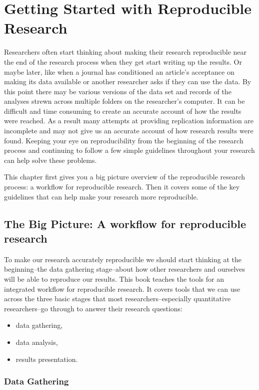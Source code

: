 \documentclass[ChapterTOCs,krantz1]{krantz}\usepackage{graphicx, color}
\begin{document}
\chapter{Getting Started with Reproducible Research}\label{GettingStarted}

Researchers often start thinking about making their research reproducible near the end of the research process when they get start writing up the results. Or maybe later, like when a journal has conditioned an article's acceptance on making its data available or another researcher asks if they can use the data. By this point there may be various versions of the data set and records of the analyses strewn across multiple folders on the researcher's computer. It can be difficult and time consuming to create an accurate account of how the results were reached. As a result many attempts at providing replication information are incomplete and may not give us an accurate account of how research results were found. Keeping your eye on reproducibility from the beginning of the research process and continuing to follow a few simple guidelines throughout your research can help solve these problems. 

This chapter first gives you a big picture overview of the reproducible research process: a workflow for reproducible research. Then it covers some of the key guidelines that can help make your research more reproducible.

\section{The Big Picture: A workflow for reproducible research}

To make our research accurately reproducible we should start thinking at the beginning--the data gathering stage--about how other researchers and ourselves will be able to reproduce our results. This book teaches the tools for an integrated workflow for reproducible research. It covers tools that we can use across the three basic stages that most researchers--especially quantitative researchers--go through to answer their research questions:

\begin{itemize}
    \item data gathering,
    \item data analysis,
    \item results presentation.
\end{itemize}

\subsection{Data Gathering}
\end{document}

